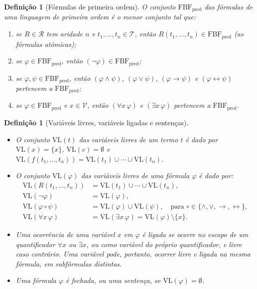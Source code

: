 \documentclass[12pt,a4paper,oneside]{report}
\theoremstyle{tituloplain}
\theoremstyle{titulodef}
\newtheorem{definicao}[teorema]{Definição}
\begin{document}
\begin{definicao}[Fórmulas de primeira ordem]\label{def:formulas-fo}
O conjunto $\mathrm{FBF}_{\mathrm{pred}}$ das \emph{fórmulas} de uma linguagem de primeira ordem é o menor conjunto tal que:
\begin{enumerate}
  \item se $R\in\mathcal{R}$ tem aridade $n$ e $t_1,\dots,t_n\in\mathcal{T}$, então $R(t_1,\dots,t_n)\in\mathrm{FBF}_{\mathrm{pred}}$ (as \emph{fórmulas atômicas});
  \item se $\varphi\in\mathrm{FBF}_{\mathrm{pred}}$, então $(\neg\varphi)\in\mathrm{FBF}_{\mathrm{pred}}$;
  \item se $\varphi,\psi\in\mathrm{FBF}_{\mathrm{pred}}$, então $(\varphi\wedge\psi)$, $(\varphi\vee\psi)$, $(\varphi\rightarrow\psi)$ e $(\varphi\leftrightarrow\psi)$ pertencem a $\mathrm{FBF}_{\mathrm{pred}}$;
  \item se $\varphi\in\mathrm{FBF}_{\mathrm{pred}}$ e $x\in\mathcal{V}$, então $(\forall x\,\varphi)$ e $(\exists x\,\varphi)$ pertencem a $\mathrm{FBF}_{\mathrm{pred}}$.
\end{enumerate}
\end{definicao}

\begin{definicao}[Variáveis livres, variáveis ligadas e sentenças]\label{def:variaveis}
\leavevmode\vspace{-0.6\baselineskip}
\begin{itemize}
  \item O conjunto $\mathrm{VL}(t)$ das \emph{variáveis livres} de um termo $t$ é dado por $\mathrm{VL}(x)=\{x\}$, $\mathrm{VL}(c)=\emptyset$ e $\mathrm{VL}(f(t_1,\dots,t_n))=\mathrm{VL}(t_1)\cup\cdots\cup\mathrm{VL}(t_n)$.
  \item O conjunto $\mathrm{VL}(\varphi)$ das variáveis livres de uma fórmula $\varphi$ é dado por:
  \begin{align*}
    \mathrm{VL}(R(t_1,\dots,t_n))&=\mathrm{VL}(t_1)\cup\cdots\cup\mathrm{VL}(t_n),\\
    \mathrm{VL}(\neg\varphi)&=\mathrm{VL}(\varphi),\\
    \mathrm{VL}(\varphi\circ\psi)&=\mathrm{VL}(\varphi)\cup\mathrm{VL}(\psi),\quad\text{para }\circ\in\{\wedge,\vee,\rightarrow,\leftrightarrow\},\\
    \mathrm{VL}(\forall x\,\varphi)&=\mathrm{VL}(\exists x\,\varphi)=\mathrm{VL}(\varphi)\setminus\{x\}.
  \end{align*}
  \item Uma ocorrência de uma variável $x$ em $\varphi$ é \emph{ligada} se ocorre no escopo de um quantificador $\forall x$ ou $\exists x$, ou como variável do próprio quantificador, e \emph{livre} caso contrário. Uma variável pode, portanto, ocorrer livre e ligada na mesma fórmula, em subfórmulas distintas.
  \item Uma fórmula $\varphi$ é \emph{fechada}, ou uma \emph{sentença}, se $\mathrm{VL}(\varphi)=\emptyset$.
\end{itemize}
\end{definicao}
\end{document}
